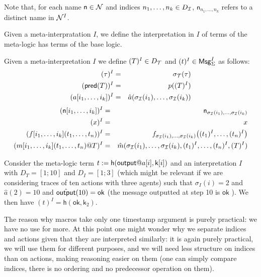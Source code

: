 Note that, for each name $\mathsf{n}\in \mathcal{N}$ and indices $n_1,\ldots,n_k \in
D_{\mathcal{I}}$, $\mathsf{n}_{n_1,\ldots,n_k}$ refers to a distinct name in $\mathcal{N}^I$.

Given a meta-interpratation $I$, we define the interpretation in $I$ of terms of the meta-logic has terms of the base logic.
\begin{definition}
  Given a meta-interpretation $I$
  we define $(T)^{I} \in D_{\mathcal{T}}$ and $(t)^{I} \in \mathsf{Msg}^I_\Sigma$ as follows:
  \begin{eqnarray*}
    (\tau)^{I} &=& \sigma_{\mathcal{T}}(\tau) \\
    (\textsf{pred}(T))^{I} &=& p((T)^{I}) \\
    (a[i_1,\ldots,i_k])^{I} &=& \hat{a}(\sigma_{\mathcal{I}}(i_1),\ldots,\sigma_{\mathcal{I}}(i_k))
  \end{eqnarray*}
  \begin{eqnarray*}
    (\mathsf{n}[i_1,\ldots,i_k])^{I} &=& \mathsf{n}_{\sigma_{\mathcal{I}}(i_1),\ldots,\sigma_{\mathcal{I}}(i_k)}
    \\
    (x)^{I} &=& x
    \\
    (f[i_1,\ldots,i_k](t_1,\ldots,t_n))^{I} &=&
    f_{\sigma_{\mathcal{I}}(i_1),\ldots,\sigma_{\mathcal{I}}(i_k)}\bigl(
      (t_1)^{I},\ldots,(t_n)^{I}
    \bigr)
    \\
    (m[i_1,\ldots,i_k](t_1,\ldots,t_n)@T)^{I} &=&
    \hat{m}(\sigma_{\mathcal{I}}(i_1),\ldots,\sigma_{\mathcal{I}}(i_k),
      (t_1)^{I},\ldots,(t_n)^{I},
      (T)^{I})
  \end{eqnarray*}
\end{definition}

\begin{example}
  Consider the meta-logic term $t := \mathsf{h}(\mout@a[i],\mathsf{k}[i])$
  and an interpretation $I$ with $D_T = [1;10]$ and $D_I = [1;3]$
  (which might be relevant if we are considering traces of ten actions
  with three agents) such that $\sigma_I(i)=2$ and $\hat{a}(2)=10$
  and $\hat{\textsf{output}}(10)=\mathsf{ok}$ (the message outputted at step 10
  is $\mathsf{ok}$ ).
  We then have $(t)^I = \mathsf{h}(\mathsf{ok},\mathsf{k}_2)$.
\end{example}

The reason why macros take only one timestamp argument is purely practical:
we have no use for more. At this point one might wonder why we separate
indices and actions given that they are interpreted similarly: it is again
purely practical, we will use them for different purposes, and we will need
less structure on indices than on actions, making reasoning easier on them
(one can simply compare indices, there is no ordering and no predecessor
operation on them).

